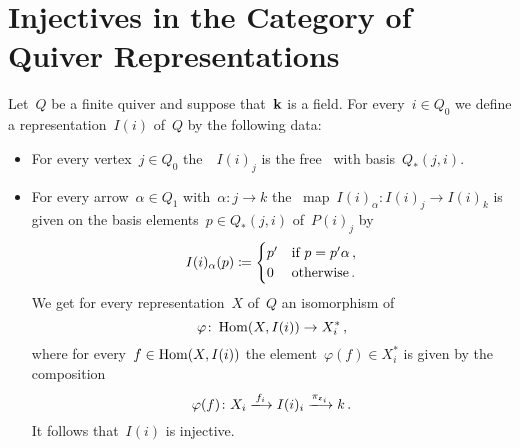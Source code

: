 \section{Injectives in the Category of Quiver Representations}


\begin{remark}
  Let~$Q$ be a finite quiver and suppose that~$\mathbf{k}$ is a field.
  For every~$i \in Q_0$ we define a representation~$I(i)$ of~$Q$ by the following data:
  \begin{itemize}
    \item
      For every vertex~$j \in Q_0$ the~{\kvs}~$I(i)_j$ is the free~{\kvs} with basis~$Q_*(j,i)$.
    \item
      For every arrow~$\alpha \in Q_1$ with~$\alpha \colon j \to k$ the~{\klin} map~$I(i)_\alpha \colon I(i)_j \to I(i)_k$ is given on the basis elements~$p \in Q_*(j,i)$ of~$P(i)_j$ by
      \[
        I(i)_\alpha(p)
        \coloneqq
        \begin{cases}
          p'  & \text{if~$p = p' \alpha$} \,, \\
          0   & \text{otherwise}  \,.
        \end{cases}
      \]
      We get for every representation~$X$ of~$Q$ an isomorphism of~{\kvs}
      \[
        \varphi
        \colon
        \operatorname{Hom}(X, I(i))
        \to
        X_i^* \,,
      \]
      where for every~$f \in \operatorname{Hom}(X,I(i))$ the element~$\varphi(f) \in X_i^*$ is given by the composition
      \[
        \varphi(f)
        \colon
        X_i
        \xlongto{f_i}
        I(i)_i
        \xlongto{\pi_{\varepsilon_i}}
        k \,.
      \]
      It follows that~$I(i)$ is injective.
  \end{itemize}
\end{remark}


